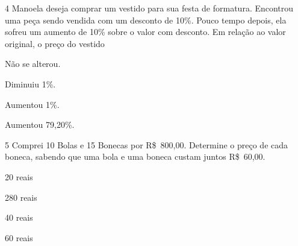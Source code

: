 
\num{4} Manoela deseja comprar um vestido para sua festa de formatura.
Encontrou uma peça sendo vendida com um desconto de 10\%. Pouco tempo
depois, ela sofreu um aumento de 10\% sobre o valor com desconto. Em
relação ao valor original, o preço do vestido
\item Não se alterou.
\item Diminuiu 1\%.
\item Aumentou 1\%.
\item Aumentou 79,20\%.









\num{5} Comprei 10 Bolas e 15 Bonecas por R\$~800,00. Determine o preço de
cada boneca, sabendo que uma bola e uma boneca custam juntos R\$~60,00.
\item 20 reais
\item 280 reais
\item 40 reais
\item 60 reais




